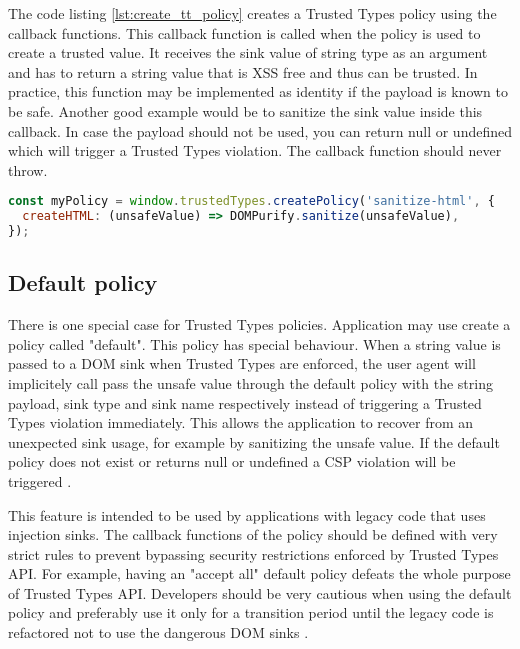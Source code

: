 The code listing \ref{lst:create_tt_policy} creates a Trusted Types policy using the callback
functions. This callback function is called when the policy is used to create a trusted value. It
receives the sink value of string type as an argument and has to return a string value that is XSS
free and thus can be trusted. In practice, this function may be implemented as identity if the
payload is known to be safe. Another good example would be to sanitize the sink value inside this
callback. In case the payload should not be used, you can return null or undefined which will
trigger a Trusted Types violation. The callback function should never throw.

\bigskip
\begin{lstlisting}[language=JavaScript, caption=Using a policy to sanitize HTML values]
const myPolicy = window.trustedTypes.createPolicy('sanitize-html', {
  createHTML: (unsafeValue) => DOMPurify.sanitize(unsafeValue),
});
\end{lstlisting}

\subsection{Default policy}

There is one special case for Trusted Types policies. Application may use create a policy called
"default". This policy has special behaviour. When a string value is passed to a DOM sink when
Trusted Types are enforced, the user agent will implicitely call pass the unsafe value through the
default policy with the string payload, sink type and sink name respectively instead of triggering a
Trusted Types violation immediately. This allows the application to recover from an unexpected sink
usage, for example by sanitizing the unsafe value. If the default policy does not exist or returns
null or undefined a CSP violation will be triggered \cite{tt_spec:default_policy}.

This feature is intended to be used by applications with legacy code that uses injection sinks. The
callback functions of the policy should be defined with very strict rules to prevent bypassing
security restrictions enforced by Trusted Types API. For example, having an "accept all" default
policy defeats the whole purpose of Trusted Types API. Developers should be very cautious when using
the default policy and preferably use it only for a transition period until the legacy code is
refactored not to use the dangerous DOM sinks \cite{tt_spec:default_policy}.

